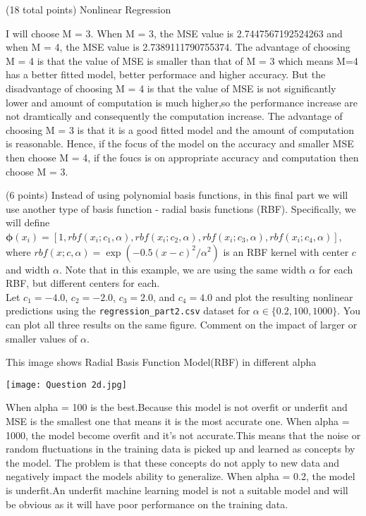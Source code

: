 \documentclass[12pt]{article}
\begin{document}
\begin{question}{(18 total points) Nonlinear Regression}
\begin{subquestion}
\begin{answerbox}{15em}
I will choose M = 3. When M = 3, the MSE value is 2.7447567192524263 and when M = 4, the MSE value is 2.7389111790755374.
The advantage of choosing M = 4 is that the value of MSE is smaller than that of M = 3 which means M=4 has a better fitted model, better performace and higher accuracy. But the disadvantage of choosing M = 4 is that the value of MSE is not significantly lower and amount of computation is much higher,so the performance increase are not dramtically and consequently the computation increase. The advantage of choosing M = 3 is that it is a good fitted model and the amount of computation is reasonable. Hence, if the focus of the model on the accuracy and smaller MSE then choose M = 4, if the foucs is on appropriate accuracy and computation then choose M = 3.
\end{answerbox}


 
\end{subquestion}



%
%
\begin{subquestion}{(6 points) Instead of using polynomial basis functions, in this final part we will use another type of basis function - radial basis functions (RBF). 
Specifically, we will define $\boldsymbol{\phi}(x_i) = [1, rbf(x_i; c_1, \alpha), rbf(x_i; c_2, \alpha), rbf(x_i; c_3, \alpha), rbf(x_i; c_4, \alpha)]$, where $rbf(x; c, \alpha) =  \exp(-0.5(x-c)^2 / \alpha^2)$ is an RBF kernel with center $c$ and width $\alpha$. Note that in this example, we are using the same width $\alpha$ for each RBF, but different centers for each.\\ 
Let $c_1=-4.0$, $c_2=-2.0$, $c_3=2.0$, and $c_4=4.0$ and plot the resulting nonlinear predictions using the \texttt{regression\_part2.csv} dataset for $\alpha \in \{0.2, 100, 1000\}$. 
You can plot all three results on the same figure.
Comment on the impact of larger or smaller values of $\alpha$.
}


\begin{answerbox}{35em}
This image shows Radial Basis Function Model(RBF) in different alpha
\begin{center}
\texttt{[image: Question 2d.jpg]}
\end{center}
When alpha = 100 is the best.Because this model is not overfit or underfit and MSE is the smallest one that means it is the most accurate one.
When alpha = 1000, the model become overfit and it's not accurate.This means that the noise or random fluctuations in the training data is picked up and learned as concepts by the model. The problem is that these concepts do not apply to new data and negatively impact the models ability to generalize.
When alpha = 0.2, the model is underfit.An underfit machine learning model is not a suitable model and will be obvious as it will have poor performance on the training data.
\end{answerbox}




\end{subquestion}
\end{question}
\end{document}
